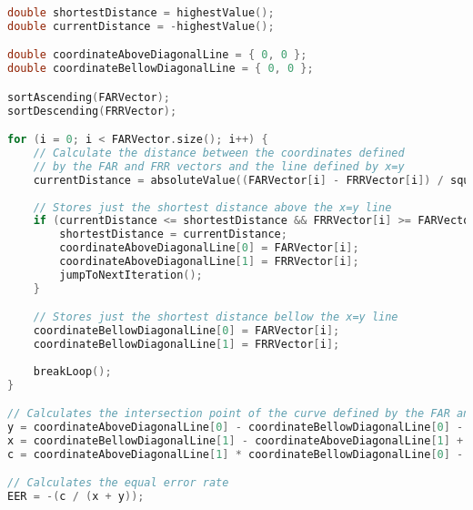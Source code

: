 \begin{lstlisting}[language=C++, caption={EER algorithm}, label={lst:EERAlgo}]
double shortestDistance = highestValue();
double currentDistance = -highestValue();

double coordinateAboveDiagonalLine = { 0, 0 };
double coordinateBellowDiagonalLine = { 0, 0 };

sortAscending(FARVector);
sortDescending(FRRVector);

for (i = 0; i < FARVector.size(); i++) {
	// Calculate the distance between the coordinates defined
	// by the FAR and FRR vectors and the line defined by x=y
	currentDistance = absoluteValue((FARVector[i] - FRRVector[i]) / squaredRoot(2));
	
	// Stores just the shortest distance above the x=y line
	if (currentDistance <= shortestDistance && FRRVector[i] >= FARVector[i]) {
		shortestDistance = currentDistance;
		coordinateAboveDiagonalLine[0] = FARVector[i];
		coordinateAboveDiagonalLine[1] = FRRVector[i];
		jumpToNextIteration();
	}

	// Stores just the shortest distance bellow the x=y line
	coordinateBellowDiagonalLine[0] = FARVector[i];
	coordinateBellowDiagonalLine[1] = FRRVector[i];
	
	breakLoop();
}

// Calculates the intersection point of the curve defined by the FAR and FRR points and the x=y line
y = coordinateAboveDiagonalLine[0] - coordinateBellowDiagonalLine[0] - 1;
x = coordinateBellowDiagonalLine[1] - coordinateAboveDiagonalLine[1] + 1;
c = coordinateAboveDiagonalLine[1] * coordinateBellowDiagonalLine[0] - coordinateAboveDiagonalLine[0] * coordinateBellowDiagonalLine[1];

// Calculates the equal error rate
EER = -(c / (x + y));
\end{lstlisting}